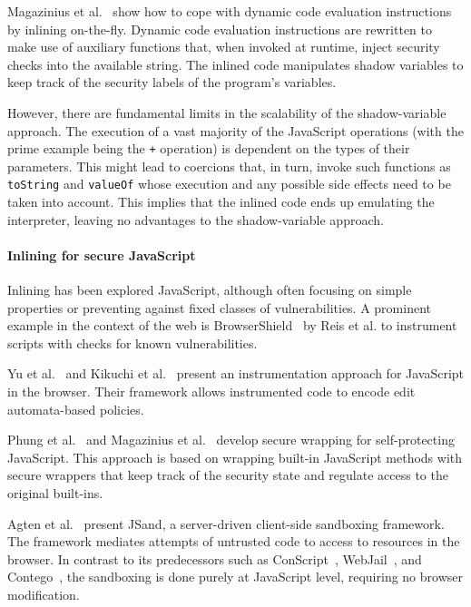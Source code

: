 \documentclass{llncs}
\begin{document}
Magazinius et
al.~\cite{Magazinius+:SEC10,DBLP:journals/compsec/MagaziniusRS12} show
how to cope with dynamic code evaluation instructions by inlining
on-the-fly. 
Dynamic code evaluation instructions are
rewritten to make use of auxiliary functions that, when invoked at
runtime, inject security checks into the available string. 
The inlined code manipulates shadow variables to keep track of the
security labels of the program's variables.

However, there are fundamental limits in the scalability of the shadow-variable approach.
The execution of a vast majority of the JavaScript operations (with
the prime example being the \lstinline{+} operation) is dependent on the types of
their
parameters. This might lead to  
coercions that, in turn, invoke such functions as \lstinline{toString} and
\lstinline{valueOf} whose execution and any possible side effects need to be taken
into account. This implies that the inlined code ends up emulating the
interpreter, leaving no advantages to the shadow-variable approach.

\paragraph{Inlining for secure JavaScript}
Inlining has been explored JavaScript, although often focusing on
simple properties or preventing against fixed classes of vulnerabilities.
A prominent example in the context of the web is
BrowserShield~\cite{Reis+:TWeb07} by Reis et al. to instrument scripts with
checks for known vulnerabilities.

Yu et al.~\cite{Yu+:POPL07} and Kikuchi et
al.~\cite{DBLP:conf/aplas/2008} present an instrumentation approach
for JavaScript in the browser. Their framework allows instrumented
code to encode edit automata-based policies.

Phung et al.~\cite{DBLP:conf/ccs/PhungSC09} and 
Magazinius et al.~\cite{DBLP:conf/nordsec/MagaziniusPS10} develop
secure wrapping for self-protecting JavaScript. This approach is based
on wrapping built-in JavaScript methods with secure wrappers that
keep track of the security state and regulate access to the original built-ins.  



Agten et al.~\cite{DBLP:conf/acsac/AgtenABPDP12} present JSand, a
server-driven client-side sandboxing framework. The framework mediates
attempts of untrusted code to access to resources in the browser.  
In contrast to its predecessors such as
ConScript~\cite{DBLP:conf/sp/MeyerovichL10}, WebJail~\cite{DBLP:conf/acsac/AckerRDPJ11}, and Contego~\cite{DBLP:conf/trust/LuoD11},
the sandboxing is done purely at JavaScript level, requiring no
browser modification.
\end{document}

